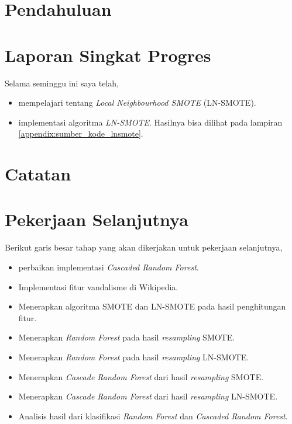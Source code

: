 






\section{Pendahuluan}

\section{Laporan Singkat Progres}

Selama seminggu ini saya telah,
\begin{itemize}
\item mempelajari tentang \textit{Local Neighbourhood SMOTE} (LN-SMOTE).
\item implementasi algoritma \textit{LN-SMOTE}. Hasilnya bisa dilihat pada
lampiran \ref{appendix:sumber_kode_lnsmote}.
\end{itemize}

\section{Catatan}



\clearpage
\section{Pekerjaan Selanjutnya}

Berikut garis besar tahap yang akan dikerjakan untuk pekerjaan selanjutnya,

\begin{itemize}
\item perbaikan implementasi \textit{Cascaded Random Forest}.
\item Implementasi fitur vandalisme di Wikipedia.
\item Menerapkan algoritma SMOTE dan LN-SMOTE pada hasil penghitungan fitur.
\item Menerapkan \textit{Random Forest} pada hasil \textit{resampling} SMOTE.
\item Menerapkan \textit{Random Forest} pada hasil \textit{resampling} LN-SMOTE.
\item Menerapkan \textit{Cascade Random Forest} dari hasil \textit{resampling}
SMOTE.
\item Menerapkan \textit{Cascade Random Forest} dari hasil \textit{resampling}
LN-SMOTE.
\item Analisis hasil dari klasifikasi \textit{Random Forest} dan
\textit{Cascaded Random Forest}.
\end{itemize}

\clearpage
{}

\advisorsignature

\clearpage
{}
\printbibliography

\newpage
\appendix



